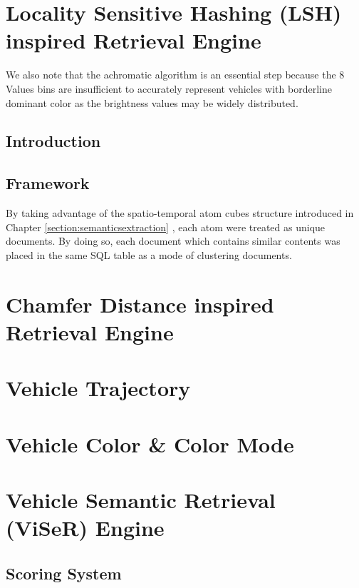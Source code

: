 

\section{Locality Sensitive Hashing (LSH) inspired Retrieval Engine}

We also note that the achromatic algorithm is an essential step because the 8 Values bins are insufficient to accurately represent vehicles with borderline dominant color as the brightness values may be widely distributed. 


\subsection{Introduction}



\subsection{Framework}
By taking advantage of the spatio-temporal atom cubes structure introduced in Chapter \ref{section:semanticsextraction} , each atom were treated as unique documents. By doing so, each document which contains similar contents was placed in the same SQL table as a mode of clustering documents.   






\section{Chamfer Distance inspired Retrieval Engine}



\section{Vehicle Trajectory}


\section{Vehicle Color \& Color Mode}


\section{Vehicle Semantic Retrieval (ViSeR) Engine }
\subsection{Scoring System}

